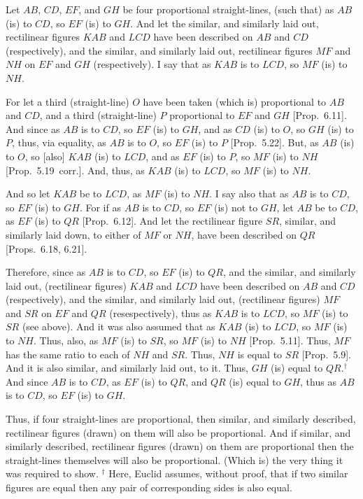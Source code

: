 \epsfysize=3in
\centerline{}

Let $AB$, $CD$, $EF$, and $GH$ be four proportional straight-lines, (such
that) as $AB$ (is) to $CD$, so $EF$ (is) to $GH$. And  let the similar, and similarly
laid out, rectilinear figures $KAB$ and $LCD$ have been described on
$AB$ and $CD$ (respectively), and the similar, and similarly
laid out, rectilinear figures $MF$ and $NH$ on $EF$ and $GH$ (respectively). 
I say that as $KAB$ is to $LCD$, so $MF$ (is) to $NH$.

For let a third (straight-line) $O$ have been taken (which is) proportional to
$AB$ and $CD$, and a third (straight-line) $P$ proportional to $EF$ and $GH$
[Prop.~6.11]. And since as $AB$ is to
$CD$, so $EF$ (is) to $GH$, and as $CD$ (is) to $O$, so $GH$ (is) to $P$, thus, via equality,
as $AB$ is to $O$, so $EF$ (is) to $P$ [Prop.~5.22].
But, as $AB$ (is) to $O$, so [also] $KAB$ (is)  to $LCD$, and as $EF$ (is) to $P$,
so $MF$ (is) to $NH$ [Prop.~5.19~corr.].
And, thus, as $KAB$ (is) to $LCD$, so $MF$ (is) to $NH$.

And so let $KAB$ be to $LCD$, as $MF$ (is) to $NH$. I say also that as
$AB$ is to $CD$, so $EF$ (is) to $GH$. For if as $AB$ is to $CD$, so $EF$ (is) not to $GH$, 
let $AB$ be to $CD$, as $EF$ (is) to $QR$ [Prop.~6.12]. And let the rectilinear figure $SR$, similar, and similarly laid down, to either  of $MF$ or $NH$, have been described on
$QR$  [Props.~6.18, 6.21].

Therefore, since as $AB$ is to $CD$, so $EF$ (is) to $QR$, and the similar, and
similarly laid out, (rectilinear figures) $KAB$ and $LCD$ have been described
on $AB$  and $CD$ (respectively), and the similar, and similarly laid out, (rectilinear figures) $MF$ and $SR$ on $EF$ and $QR$ (resespectively), thus
as $KAB$ is to $LCD$, so $MF$ (is) to $SR$  (see above). And it was also assumed
that as $KAB$ (is) to $LCD$, so $MF$ (is) to $NH$. Thus, also, as $MF$ (is) to $SR$,
so $MF$ (is) to $NH$ [Prop.~5.11]. Thus, $MF$ has the same ratio to each of $NH$ and $SR$. 
Thus, $NH$ is equal to $SR$ [Prop.~5.9].
And it is also similar, and similarly laid out, to it. Thus,  $GH$ (is) equal to $QR$.$^\dag$
And since $AB$ is to $CD$, as $EF$ (is) to $QR$, and $QR$ (is) equal to $GH$, thus
as $AB$ is to $CD$, so $EF$ (is) to $GH$.

Thus, if four straight-lines are proportional, then
similar, and similarly described, rectilinear figures (drawn) on them will also
be proportional. And if similar, and similarly described, rectilinear figures (drawn) on them are proportional then the  straight-lines themselves will also be proportional. (Which is) the very thing it was required to show.
{\footnotesize \noindent$^\dag$ Here, Euclid assumes, without proof, that
if two similar figures are equal then any pair of corresponding sides is also
equal.}

